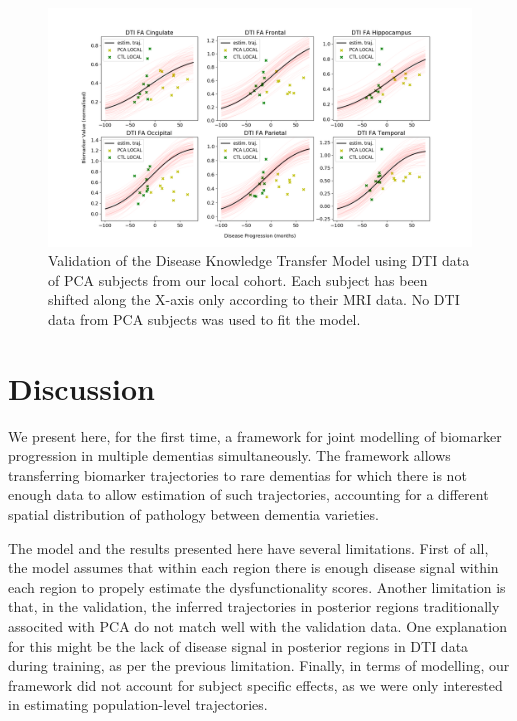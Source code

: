 \documentclass{llncs}
\begin{document}

\begin{figure}[H]
 \includegraphics[width=\textwidth, trim=0 0 0 0, clip]{figures/validDtiPCA.png}
 \caption{Validation of the Disease Knowledge Transfer Model using DTI data of PCA subjects from our local cohort. Each subject has been shifted along the X-axis only according to their MRI data. No DTI data from PCA subjects was used to fit the model.}
\label{fig:DTIvalid}
\end{figure}

\section{Discussion}

We present here, for the first time, a framework for joint modelling of biomarker progression in multiple dementias simultaneously. The framework allows transferring biomarker trajectories to rare dementias for which there is not enough data to allow estimation of such trajectories, accounting for a different spatial distribution of pathology between dementia varieties. 

The model and the results presented here have several limitations. First of all, the model assumes that within each region there is enough disease signal within each region to propely estimate the dysfunctionality scores.  Another limitation is that, in the validation, the inferred trajectories in posterior regions traditionally associted with PCA do not match well with the validation data. One explanation for this might be the lack of disease signal in posterior regions in DTI data during training, as per the previous limitation. Finally, in terms of modelling, our framework did not account for subject specific effects, as we were only interested in estimating population-level trajectories.
\end{document}
